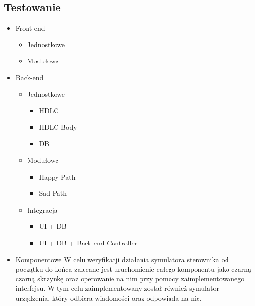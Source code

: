 \subsection{Testowanie}
\begin{itemize}
\item Front-end
	\begin{itemize}
		\item Jednostkowe
		\item Modułowe
	\end{itemize}
\item Back-end
	\begin{itemize}
		\item Jednostkowe
		\begin{itemize}
			\item HDLC
			\item HDLC Body
			\item DB
		\end{itemize}
		\item Modułowe
		\begin{itemize}
			\item Happy Path
			\item Sad Path
		\end{itemize}
		\item Integracja
		\begin{itemize}
			\item UI + DB
			\item UI + DB + Back-end Controller
		\end{itemize}
	\end{itemize}
\item Komponentowe \newline
	W celu weryfikacji działania symulatora sterownika od początku do końca zalecane jest uruchomienie całego komponentu 
	jako czarną czarną skrzynkę oraz operowanie na nim przy pomocy zaimplementowanego interfejsu. W tym celu
	zaimplementowany został również symulator urządzenia, który odbiera wiadomości oraz odpowiada na nie.
\end{itemize}
